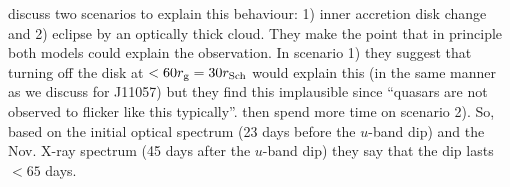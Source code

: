 \documentclass[11pt,a4paper]{article}
\begin{document}
\citet{Guo2016} discuss two scenarios to explain this behaviour: 1)
inner accretion disk change and 2) eclipse by an optically thick
cloud. They make the point that in principle both models could explain
the observation. In scenario 1) they suggest that turning off the disk
at $< 60 r_{\rm g} = 30 r_{\rm Sch}$ would explain this (in the same
manner as we discuss for J11057) but they find this implausible since
``quasars are not observed to flicker like this typically''.
\citet{Guo2016} then spend more time on scenario 2). So, based on the
initial optical spectrum (23 days before the $u$-band dip) and the
Nov. X-ray spectrum (45 days after the $u$-band dip) they say that the
dip lasts $< 65$ days.





\end{document}
